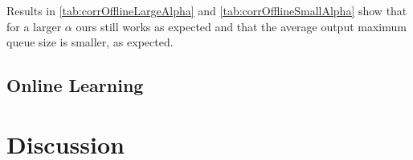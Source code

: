 \documentclass[10pt,sigconf,letterpaper,anonymous]{acmart}
\begin{document}
Results in \autoref{tab:corrOfflineLargeAlpha} and \autoref{tab:corrOfflineSmallAlpha} show that for a larger $\alpha$ \gls{ours} still works as expected and that the average output maximum queue size is smaller, as expected. 

\subsection{Online Learning}

\section{Discussion}



\end{document}
